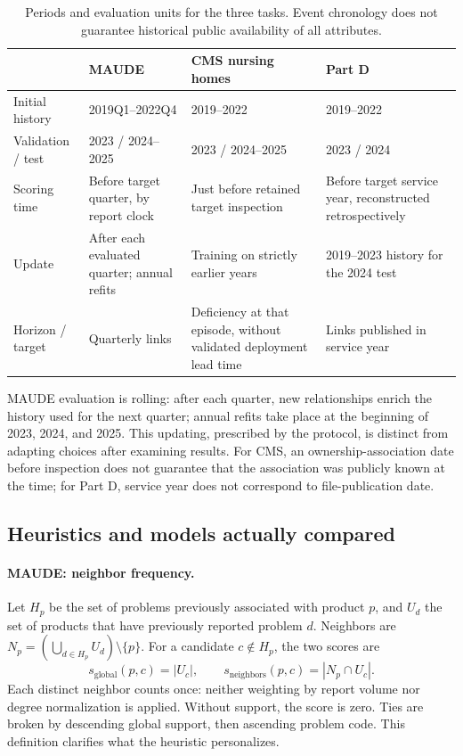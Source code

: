 \begin{table}[!htbp]
\centering\footnotesize
\caption{Periods and evaluation units for the three tasks. Event chronology does not guarantee historical public availability of all attributes.}
\label{tab:time}
\begin{tabularx}{\linewidth}{@{}lXXX@{}}
\toprule
 & MAUDE & CMS nursing homes & Part D\\
\midrule
Initial history & 2019Q1--2022Q4 & 2019--2022 & 2019--2022\\
Validation / test & 2023 / 2024--2025 & 2023 / 2024--2025 & 2023 / 2024\\
Scoring time & Before target quarter, by report clock & Just before retained target inspection & Before target service year, reconstructed retrospectively\\
Update & After each evaluated quarter; annual refits & Training on strictly earlier years & 2019--2023 history for the 2024 test\\
Horizon / target & Quarterly links & Deficiency at that episode, without validated deployment lead time & Links published in service year\\
\bottomrule
\end{tabularx}
\end{table}

MAUDE evaluation is rolling: after each quarter, new relationships enrich the history used for the next quarter; annual refits take place at the beginning of 2023, 2024, and 2025. This updating, prescribed by the protocol, is distinct from adapting choices after examining results. For CMS, an ownership-association date before inspection does not guarantee that the association was publicly known at the time; for Part D, service year does not correspond to file-publication date\cite{hgbcode,hgbresults}.

\subsection{Heuristics and models actually compared}
\label{sec:models}

\paragraph{MAUDE: neighbor frequency.} Let $H_p$ be the set of problems previously associated with product $p$, and $U_d$ the set of products that have previously reported problem $d$. Neighbors are $N_p=(\bigcup_{d\in H_p} U_d)\setminus\{p\}$. For a candidate $c\notin H_p$, the two scores are
\begin{equation}
 s_{\mathrm{global}}(p,c)=|U_c|,\qquad
 s_{\mathrm{neighbors}}(p,c)=|N_p\cap U_c|.
\end{equation}
Each distinct neighbor counts once: neither weighting by report volume nor degree normalization is applied. Without support, the score is zero. Ties are broken by descending global support, then ascending problem code\cite{hgbcode}. This definition clarifies what the heuristic personalizes.

